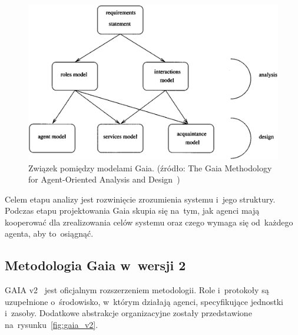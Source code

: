 \documentclass[11pt]{report}
\begin{document}
    \begin{figure}[!ht]
        \centering
        \includegraphics[width=\linewidth]{fig/gaia models.png}
        \caption{Związek pomiędzy modelami Gaia. (źródło: The Gaia Methodology for Agent-Oriented Analysis and Design~\cite{Wooldridge2000a})}
        \label{fig:gaia}
    \end{figure}

    Celem etapu analizy jest rozwinięcie zrozumienia systemu i~jego struktury.
    Podczas etapu projektowania Gaia skupia się na~tym, jak agenci mają kooperować dla zrealizowania celów systemu oraz czego wymaga się od~każdego agenta, aby to~osiągnąć.

    \subsection{Metodologia Gaia w~wersji 2}
    GAIA v2~\cite{Zambonelli2003} jest oficjalnym rozszerzeniem metodologii.
    Role i~protokoły są uzupełnione o~środowisko, w~którym działają agenci, specyfikujące jednostki i~zasoby.
    Dodatkowe abstrakcje organizacyjne zostały przedstawione na~rysunku~\ref{fig:gaia_v2}.
\end{document}
